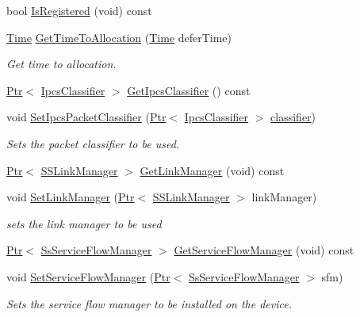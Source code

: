 \begin{DoxyCompactItemize}
bool \hyperlink{classns3_1_1SubscriberStationNetDevice_ad88fedaf8b13d09d0c0d9aa0e52dc1b0}{Is\+Registered} (void) const 
\item 
\hyperlink{classns3_1_1Time}{Time} \hyperlink{classns3_1_1SubscriberStationNetDevice_aa487cd0f2d3291d23a4ccdcce0b80801}{Get\+Time\+To\+Allocation} (\hyperlink{classns3_1_1Time}{Time} defer\+Time)
\begin{DoxyCompactList}\small\item\em Get time to allocation. \end{DoxyCompactList}\item 
\hyperlink{classns3_1_1Ptr}{Ptr}$<$ \hyperlink{classns3_1_1IpcsClassifier}{Ipcs\+Classifier} $>$ \hyperlink{classns3_1_1SubscriberStationNetDevice_ab16ae477949fafaf132bfe2d8fb8f3cc}{Get\+Ipcs\+Classifier} () const 
\item 
void \hyperlink{classns3_1_1SubscriberStationNetDevice_a3b4eaebe60f48b6d75e4d487bb036989}{Set\+Ipcs\+Packet\+Classifier} (\hyperlink{classns3_1_1Ptr}{Ptr}$<$ \hyperlink{classns3_1_1IpcsClassifier}{Ipcs\+Classifier} $>$ \hyperlink{design_8txt_af9e6b398b148789960232a87c72a107e}{classifier})
\begin{DoxyCompactList}\small\item\em Sets the packet classifier to be used. \end{DoxyCompactList}\item 
\hyperlink{classns3_1_1Ptr}{Ptr}$<$ \hyperlink{classns3_1_1SSLinkManager}{S\+S\+Link\+Manager} $>$ \hyperlink{classns3_1_1SubscriberStationNetDevice_abd6cc1e645a5e7a84ea37a997fdfcea7}{Get\+Link\+Manager} (void) const 
\item 
void \hyperlink{classns3_1_1SubscriberStationNetDevice_abf4511ae0cb9baaad9e12102287dd9c4}{Set\+Link\+Manager} (\hyperlink{classns3_1_1Ptr}{Ptr}$<$ \hyperlink{classns3_1_1SSLinkManager}{S\+S\+Link\+Manager} $>$ link\+Manager)
\begin{DoxyCompactList}\small\item\em sets the link manager to be used \end{DoxyCompactList}\item 
\hyperlink{classns3_1_1Ptr}{Ptr}$<$ \hyperlink{classns3_1_1SsServiceFlowManager}{Ss\+Service\+Flow\+Manager} $>$ \hyperlink{classns3_1_1SubscriberStationNetDevice_a7ad10073f7d4779df6e87e4a3766701a}{Get\+Service\+Flow\+Manager} (void) const 
\item 
void \hyperlink{classns3_1_1SubscriberStationNetDevice_ad832105261e7b990c75dad68f18acaf7}{Set\+Service\+Flow\+Manager} (\hyperlink{classns3_1_1Ptr}{Ptr}$<$ \hyperlink{classns3_1_1SsServiceFlowManager}{Ss\+Service\+Flow\+Manager} $>$ sfm)
\begin{DoxyCompactList}\small\item\em Sets the service flow manager to be installed on the device. \end{DoxyCompactList}\end{DoxyCompactItemize}
